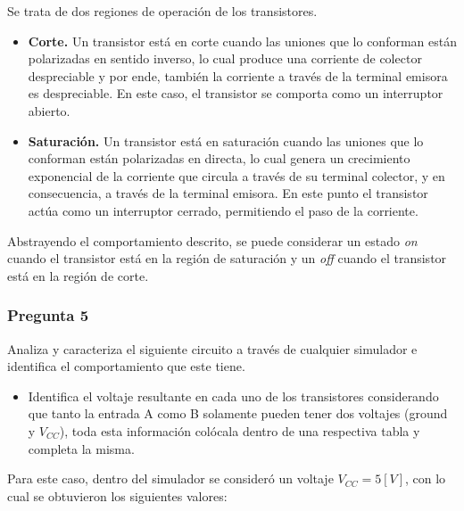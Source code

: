 \documentclass[../procedimientos.tex]{subfiles}
\begin{document}
Se trata de dos regiones de operación de los transistores.
\begin{itemize}
  \item \textbf{Corte.} Un transistor está en corte cuando las uniones que lo 
    conforman están polarizadas en sentido inverso, lo cual produce una 
    corriente de colector despreciable y por ende, también la corriente a 
    través de la terminal emisora es despreciable. En este caso, el transistor 
    se comporta como un interruptor abierto.

  \item \textbf{Saturación.} Un transistor está en saturación cuando las 
    uniones que lo conforman están polarizadas en directa, lo cual genera un 
    crecimiento exponencial de la corriente que circula a través de su 
    terminal colector, y en consecuencia, a través de la terminal emisora. En 
    este punto el transistor actúa como un interruptor cerrado, permitiendo el 
    paso de la corriente.
\end{itemize}

Abstrayendo el comportamiento descrito, se puede considerar un estado 
\textit{on} cuando el transistor está en la región de saturación y un 
\textit{off} cuando el transistor está en la región de corte.

\subsubsection*{Pregunta 5}
\begin{em}
  Analiza y caracteriza el siguiente circuito a través de cualquier simulador 
  e identifica el comportamiento que este tiene.
  \begin{itemize}
    \item Identifica el voltaje resultante en cada uno de los transistores 
      considerando que tanto la entrada A como B solamente pueden tener dos 
      voltajes (ground y $V_{CC}$), toda esta información colócala dentro de 
      una respectiva tabla y completa la misma.
  \end{itemize}
\end{em}

Para este caso, dentro del simulador se consideró un voltaje $V_{CC} = 5 [V]$, 
con lo cual se obtuvieron los siguientes valores:
\end{document}
